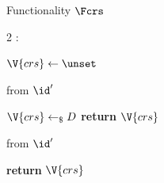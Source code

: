 \begin{interface}[nofloat]{Functionality $\Fcrs$ \\
}

{\scriptsize
\setlength{\columnsep}{1.4em}
\begin{multicols}{2}
:
\begin{algorithmic}[1]
\setcounter{contline}{0}\algcont
\State $\V{crs} \gets \unset$
\algsave
\end{algorithmic}
\vspace{1.4ex}

 \quad from $\id'$
\begin{algorithmic}[1]
\algcont
{}
  \State $\V{crs} \gets_{\$} D$ \label{ln:crssample}
\EndIf
\State \textbf{return} $\V{crs}$ \label{ln:crssame}
\algsave
\end{algorithmic}
\vspace{1.4ex}

\columnbreak

 \quad from $\id'$
\begin{algorithmic}[1]
\algcont
\State \textbf{return} $\V{crs}$ \label{ln:crsleak}
\algsave
\end{algorithmic}
\end{multicols}}
\end{interface}
